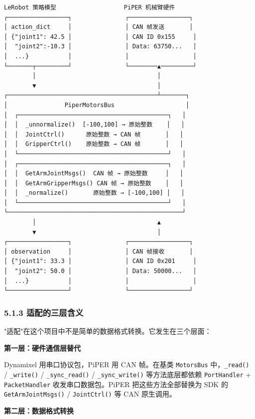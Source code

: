 \documentclass[UTF8,a4paper,11pt]{ctexart}
\begin{document}
\begin{lstlisting}[language=text]
LeRobot 策略模型                   PiPER 机械臂硬件
┌─────────────────┐               ┌─────────────────┐
│ action_dict     │               │ CAN 帧发送       │
│ {"joint1": 42.5 │               │ CAN ID 0x155     │
│  "joint2":-10.3 │               │ Data: 63750...   │
│  ...}           │               │                  │
└───────┬─────────┘               └────────▲─────────┘
        │                                  │
        ▼                                  │
┌──────────────────────────────────────────┴───────┐
│                PiperMotorsBus                    │
│  ┌──────────────────────────────────────────┐   │
│  │  _unnormalize()  [-100,100] → 原始整数    │   │
│  │  JointCtrl()      原始整数 → CAN 帧       │   │
│  │  GripperCtrl()    原始整数 → CAN 帧       │   │
│  └──────────────────────────────────────────┘   │
│  ┌──────────────────────────────────────────┐   │
│  │  GetArmJointMsgs()  CAN 帧 → 原始整数     │   │
│  │  GetArmGripperMsgs() CAN 帧 → 原始整数    │   │
│  │  _normalize()       原始整数 → [-100,100] │   │
│  └──────────────────────────────────────────┘   │
└─────────────────────────────────────────────────┘
        │                                  ▲
        ▼                                  │
┌─────────────────┐               ┌─────────────────┐
│ observation     │               │ CAN 帧接收       │
│ {"joint1": 33.3 │               │ CAN ID 0x201     │
│  "joint2": 50.0 │               │ Data: 50000...   │
│  ...}           │               │                  │
└─────────────────┘               └─────────────────┘
\end{lstlisting}

\subsubsection{5.1.3 适配的三层含义}

"适配"在这个项目中不是简单的数据格式转换。它发生在三个层面：

\textbf{第一层：硬件通信层替代}

Dynamixel 用串口协议包，PiPER 用 CAN 帧。在基类 \texttt{MotorsBus} 中，\texttt{_read()} / \texttt{_write()} / \texttt{_sync_read()} / \texttt{_sync_write()} 等方法底层都依赖 \texttt{PortHandler} + \texttt{PacketHandler} 收发串口数据包。PiPER 把这些方法全部替换为 SDK 的 \texttt{GetArmJointMsgs()} / \texttt{JointCtrl()} 等 CAN 原生调用。

\textbf{第二层：数据格式转换}
\end{document}
